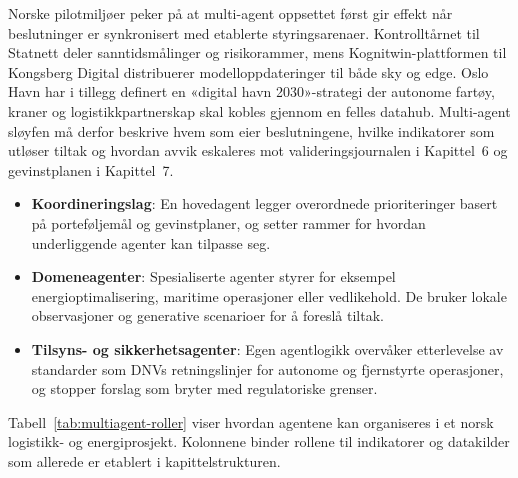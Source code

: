 Norske pilotmiljøer peker på at multi-agent oppsettet først gir effekt når beslutninger er synkronisert med etablerte styringsarenaer. Kontrolltårnet til Statnett deler sanntidsmålinger og risikorammer, mens Kognitwin-plattformen til Kongsberg Digital distribuerer modelloppdateringer til både sky og edge.\citep{statnett2024kontrolltarn,kongsberg2023kognitwin} Oslo Havn har i tillegg definert en «digital havn 2030»-strategi der autonome fartøy, kraner og logistikkpartnerskap skal kobles gjennom en felles datahub.\citep{oslohavn2023digitalhavn} Multi-agent sløyfen må derfor beskrive hvem som eier beslutningene, hvilke indikatorer som utløser tiltak og hvordan avvik eskaleres mot valideringsjournalen i Kapittel~6 og gevinstplanen i Kapittel~7.

\begin{itemize}
    \item \textbf{Koordineringslag}: En hovedagent legger overordnede prioriteringer basert på porteføljemål og gevinstplaner, og setter rammer for hvordan underliggende agenter kan tilpasse seg.
    \item \textbf{Domeneagenter}: Spesialiserte agenter styrer for eksempel energioptimalisering, maritime operasjoner eller vedlikehold. De bruker lokale observasjoner og generative scenarioer for å foreslå tiltak.
    \item \textbf{Tilsyns- og sikkerhetsagenter}: Egen agentlogikk overvåker etterlevelse av standarder som DNVs retningslinjer for autonome og fjernstyrte operasjoner, og stopper forslag som bryter med regulatoriske grenser.\citep{dnv2021autonomous}
\end{itemize}

Tabell~\ref{tab:multiagent-roller} viser hvordan agentene kan organiseres i et norsk logistikk- og energiprosjekt. Kolonnene binder rollene til indikatorer og datakilder som allerede er etablert i kapittelstrukturen.

